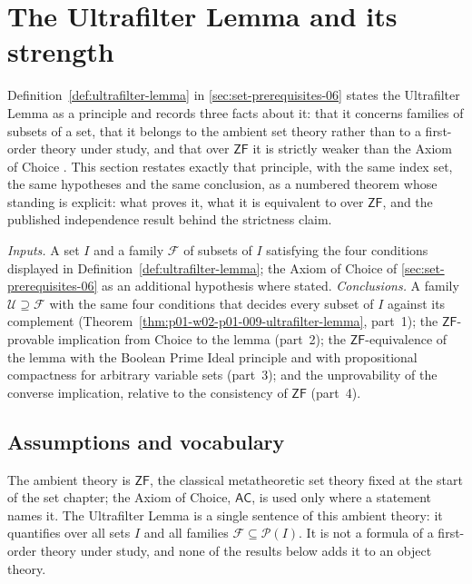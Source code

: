 \section{The Ultrafilter Lemma and its strength}
\label{sec:p01-w02-p01-009-ultrafilter-lemma}

Definition~\ref{def:ultrafilter-lemma} in \cref{sec:set-prerequisites-06}
states the Ultrafilter Lemma as a principle and records three facts about it:
that it concerns families of subsets of a set, that it belongs to the ambient
set theory rather than to a first-order theory under study, and that over
\(\mathsf{ZF}\) it is strictly weaker than the Axiom of Choice
\cite[ch.~``Sets, Relations, Functions, and Cardinality'', sec.~``Choice
principles used later'', definition ``Ultrafilter Lemma'']{FrozenFormalLogicUltrafilterLemma}.
This section restates exactly that principle, with the same index set, the
same hypotheses and the same conclusion, as a numbered theorem whose standing
is explicit: what proves it, what it is equivalent to over \(\mathsf{ZF}\),
and the published independence result behind the strictness claim.

\emph{Inputs.} A set \(I\) and a family \(\mathcal F\) of subsets of \(I\)
satisfying the four conditions displayed in
Definition~\ref{def:ultrafilter-lemma}; the Axiom of Choice of
\cref{sec:set-prerequisites-06} as an additional hypothesis where stated.
\emph{Conclusions.} A family \(\mathcal U\supseteq\mathcal F\) with the same
four conditions that decides every subset of \(I\) against its complement
(Theorem~\ref{thm:p01-w02-p01-009-ultrafilter-lemma}, part~1); the
\(\mathsf{ZF}\)-provable implication from Choice to the lemma (part~2); the
\(\mathsf{ZF}\)-equivalence of the lemma with the Boolean Prime Ideal
principle and with propositional compactness for arbitrary variable sets
(part~3); and the unprovability of the converse implication, relative to the
consistency of \(\mathsf{ZF}\) (part~4).

\subsection{Assumptions and vocabulary}
\label{sec:p01-w02-p01-009-assumptions}

The ambient theory is \(\mathsf{ZF}\), the classical metatheoretic set theory
fixed at the start of the set chapter; the Axiom of Choice,
\(\mathsf{AC}\), is used only where a statement names it. The Ultrafilter
Lemma is a single sentence of this ambient theory: it quantifies over all
sets \(I\) and all families \(\mathcal F\subseteq\mathcal P(I)\). It is not
a formula of a first-order theory under study, and none of the results below
adds it to an object theory.

